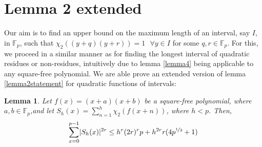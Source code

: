 \documentclass{report}
\newtheorem{lemma}{Lemma}
\begin{document}
\section{Lemma 2 extended}
%
Our aim is to find an upper bound on the maximum length of an interval, say $I$, in $\mathbb{F}_p$, such that $\chi_2((y+q)(y+r))=1 \text{ }\forall y\in I$ for some $q,r\in \mathbb{F}_p$. For this, we proceed in a similar manner as for finding the longest interval of quadratic residues or non-residues, intuitively due to lemma \ref{lemma4} being applicable to any square-free polynomial. We are able prove an extended version of lemma \ref{lemma2statement} for quadratic functions of intervals:
%
\begin{lemma} \label{lemma5statement}
Let $f(x)=(x+a)(x+b)$ be a square-free polynomial, where $a,b\in \mathbb{F}_p$,and let $S_h(x)=\sum\limits_{n=1}^{h} \chi_2(f(x+n))$, where $h<p$. Then,
\begin{equation} \label{lemma5}
\sum\limits_{x=0}^{p-1}\lvert S_h(x)\rvert ^{2r}\leq h^{r}(2r)^{r}p+h^{2r}r(4p^{\nicefrac{1}{2}}+1)
\end{equation}
\end{lemma}
\end{document}
